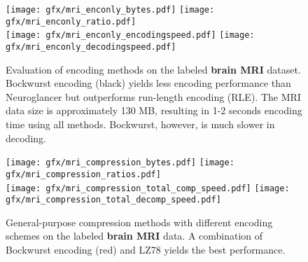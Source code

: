 %
% 
%
\begin{figure}[h]
\texttt{[image: gfx/mri\_enconly\_bytes.pdf]}%
\texttt{[image: gfx/mri\_enconly\_ratio.pdf]}%
\\
\texttt{[image: gfx/mri\_enconly\_encodingspeed.pdf]}%
\texttt{[image: gfx/mri\_enconly\_decodingspeed.pdf]}%
\caption{Evaluation of encoding methods on the labeled \textbf{brain MRI} dataset. Bockwurst encoding (black) yields less encoding performance than Neuroglancer but outperforms run-length encoding (RLE). The MRI data size is approximately 130 MB, resulting in 1-2 seconds encoding time using all methods. Bockwurst, however, is much slower in decoding.}
\label{fig:mri_encoding_results}
\end{figure}


\begin{figure}[h]
\texttt{[image: gfx/mri\_compression\_bytes.pdf]}%
\texttt{[image: gfx/mri\_compression\_ratios.pdf]}%
\\
\texttt{[image: gfx/mri\_compression\_total\_comp\_speed.pdf]}%
\texttt{[image: gfx/mri\_compression\_total\_decomp\_speed.pdf]}%
\caption{General-purpose compression methods with different encoding schemes on the labeled \textbf{brain MRI} data. A combination of Bockwurst encoding (red) and LZ78 yields the best performance.}
\label{fig:mri_compression_results}
\end{figure}
